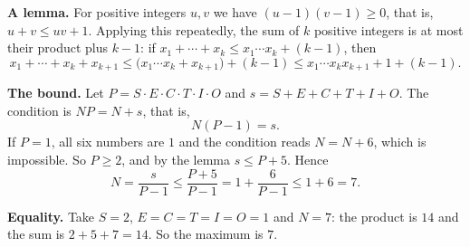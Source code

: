 \textbf{A lemma.} For positive integers $u,v$ we have $(u-1)(v-1)\ge0$, that is, $u+v\le uv+1$. Applying this repeatedly, the sum of $k$ positive integers is at most their product plus $k-1$: if $x_1+\cdots+x_k\le x_1\cdots x_k+(k-1)$, then
\[x_1+\cdots+x_k+x_{k+1}\le\bigl(x_1\cdots x_k+x_{k+1}\bigr)+(k-1)\le x_1\cdots x_kx_{k+1}+1+(k-1).\]

\textbf{The bound.} Let $P=S\cdot E\cdot C\cdot T\cdot I\cdot O$ and $s=S+E+C+T+I+O$. The condition is $NP=N+s$, that is,
\[N(P-1)=s.\]
If $P=1$, all six numbers are $1$ and the condition reads $N=N+6$, which is impossible. So $P\ge2$, and by the lemma $s\le P+5$. Hence
\[N=\dfrac{s}{P-1}\le\dfrac{P+5}{P-1}=1+\dfrac{6}{P-1}\le1+6=7.\]

\textbf{Equality.} Take $S=2$, $E=C=T=I=O=1$ and $N=7$: the product is $14$ and the sum is $2+5+7=14$. So the maximum is $\boxed{7}$.
